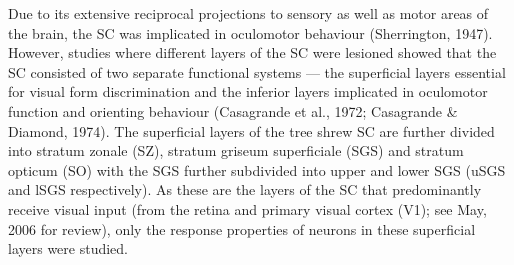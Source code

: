 Due to its extensive reciprocal projections to sensory as well as motor areas of the brain, the SC was implicated in oculomotor behaviour (Sherrington, 1947). However, studies where different layers of the SC were lesioned showed that the SC consisted of two separate functional systems --- the superficial layers essential for visual form discrimination and the inferior layers implicated in oculomotor function and orienting behaviour (Casagrande et al., 1972; Casagrande \& Diamond, 1974). The superficial layers of the tree shrew SC are further divided into stratum zonale (SZ), stratum griseum superficiale (SGS) and stratum opticum (SO) with the SGS further subdivided into upper and lower SGS (uSGS and lSGS respectively). As these are the layers of the SC that predominantly receive visual input (from the retina and primary visual cortex (V1); see May, 2006 for review), only the response properties of neurons in these superficial layers were studied.

